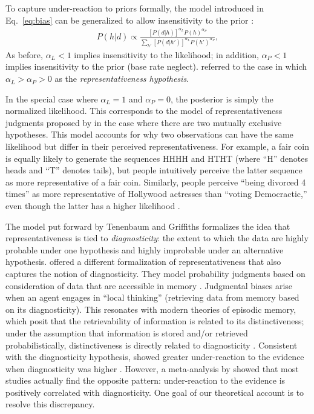 To capture under-reaction to priors formally, the model introduced in Eq.~\ref{eq:bias} can be generalized to allow insensitivity to the prior \citep{grether1980bayes}:
\begin{align}
    P(h|d) \propto \frac{[P(d|h)]^{\alpha_L} P(h)^{\alpha_P}}{\sum_{h'} [P(d|h')]^{\alpha_L} P(h')^{\alpha_P}},
    \label{eq:bias2}
\end{align}
As before, $\alpha_L<1$ implies insensitivity to the likelihood; in addition, $\alpha_P<1$ implies insensitivity to the prior (base rate neglect). \citet{grether1980bayes} referred to the case in which $\alpha_L>\alpha_P>0$ as the \emph{representativeness hypothesis}. 

In the special case where $\alpha_L=1$ and $\alpha_P=0$, the posterior is simply the normalized likelihood. This corresponds to the model of representativeness judgments proposed by \citet{tenenbaum2001rational} in the case where there are two mutually exclusive hypotheses. This model accounts for why two observations can have the same likelihood but differ in their perceived representativeness. For example, a fair coin is equally likely to generate the sequences HHHH and HTHT (where ``H'' denotes heads and ``T'' denotes tails), but people intuitively perceive the latter sequence as more representative of a fair coin. Similarly, people perceive ``being divorced 4 times'' as more representative of Hollywood actresses than ``voting Democractic,'' even though the latter has a higher likelihood \citep{tversky1983extensional}.

The model put forward by Tenenbaum and Griffiths formalizes the idea that representativeness is tied to \emph{diagnosticity}: the extent to which the data are highly probable under one hypothesis and highly improbable under an alternative hypothesis. \citet{gennaioli2010comes} offered a different formalization of representativeness that also captures the notion of diagnosticity. They model probability judgments based on consideration of data that are accessible in memory \citep[see also][]{dougherty1999minerva}. Judgmental biases arise when an agent engages in ``local thinking'' (retrieving data from memory based on its diagnosticity). This resonates with modern theories of episodic memory, which posit that the retrievability of information is related to its distinctiveness; under the assumption that information is stored and/or retrieved probabilistically, distinctiveness is directly related to diagnosticity \citep{mcclelland1998familiarity,shiffrin1997model}.
Consistent with the diagnosticity hypothesis, \citet{fischhoff1984diagnosticity} showed greater under-reaction to the evidence when diagnosticity was higher \citep[see also][]{bar1980base,ofir1988pseudodiagnosticity}. However, a meta-analysis by \citet{benjamin18} showed that most studies actually find the opposite pattern: under-reaction to the evidence is positively correlated with diagnosticity. One goal of our theoretical account is to resolve this discrepancy.

